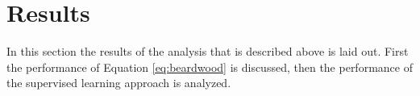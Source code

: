 \section{Results}
In this section the results of the analysis that is described above is laid out. First the performance of Equation
\ref{eq:beardwood} is discussed, then the performance of the supervised learning approach is analyzed.




